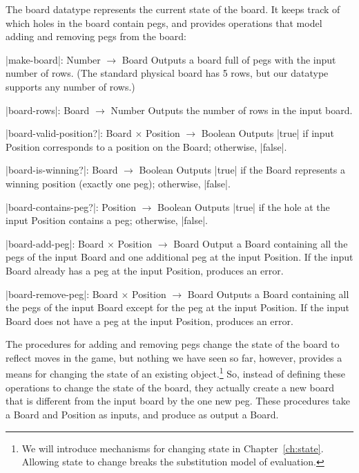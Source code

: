 \begin{schemeregion}
{ The board datatype represents the current state of the board.  It keeps track of which holes in the board contain pegs, and provides operations that model adding and removing pegs from the board:
\begin{procedurelist}
\item[\scheme|make-board|: Number $\rightarrow$ Board] \forcenl Outputs a board full of pegs with the input number of rows.  (The standard physical board has 5 rows, but our datatype supports any number of rows.)
\item[\scheme|board-rows|: Board $\rightarrow$ Number] \forcenl Outputs the number of rows in the input board.
\item[\scheme|board-valid-position?|: Board $\times$ Position] $\rightarrow$ Boolean \forcenl Outputs \scheme|true| if input Position corresponds to a position on the Board; otherwise, \scheme|false|.
\item[\scheme|board-is-winning?|: Board $\rightarrow$ Boolean] \forcenl Outputs \scheme|true| if the Board represents a winning position (exactly one peg); otherwise, \scheme|false|.
\item[\scheme|board-contains-peg?|: Position $\rightarrow$ Boolean] \forcenl Outputs \scheme|true| if the hole at the input Position contains a peg; otherwise, \scheme|false|.
\item[\scheme|board-add-peg|: Board $\times$ Position $\rightarrow$ Board] \forcenl Output a Board containing all the pegs of the input Board and one additional peg at the input Position.  If the input Board already has a peg at the input Position, produces an error.
\item[\scheme|board-remove-peg|: Board $\times$ Position $\rightarrow$ Board] \forcenl Outputs a Board containing all the pegs of the input Board except for the peg at the input Position.  If the input Board does not have a peg at the input Position, produces an error.
\end{procedurelist}

The procedures for adding and removing pegs change the state of the board to reflect moves in the game, but nothing we have seen so far, however, provides a means for changing the state of an existing object.\footnote{We will introduce mechanisms for changing state in Chapter~\ref{ch:state}.  Allowing state to change breaks the substitution model of evaluation.}  So, instead of defining these operations to change the state of the board, they actually create a new board that is different from the input board by the one new peg.  These procedures take a Board and Position as inputs, and produce as output a Board.

}
\end{schemeregion}
